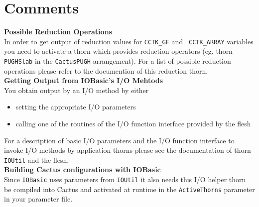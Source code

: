 \documentclass{article}
\begin{document}
\section{Comments}
%
{\bf Possible Reduction Operations}\\
%
In order to get output of reduction values for {\tt CCTK\_GF} and {\tt
CCTK\_ARRAY} variables you need to activate a thorn which provides
reduction operators (eg. thorn {\tt PUGHSlab} in the {\tt CactusPUGH}
arrangement). For a list of possible reduction operations please refer to
the documention of this reduction thorn.\\[3ex]
%
{\bf Getting Output from IOBasic's I/O Mehtods}\\
%
You obtain output by an I/O method by either
%
\begin{itemize}
  \item setting the appropriate I/O parameters
  \item calling one of the routines of the I/O function interface
        provided by the flesh
\end{itemize}
%
For a description of basic I/O parameters and the I/O function interface to
invoke I/O methods by application thorns please see the documentation of thorn
{\tt IOUtil} and the flesh.\\[3ex]
%
%
{\bf Building Cactus configurations with IOBasic}\\
%
Since {\tt IOBasic} uses parameters from {\tt IOUtil} it also needs this I/O
helper thorn be compiled into Cactus and activated at runtime in the
{\tt ActiveThorns} parameter in your parameter file.
%



\end{document}
